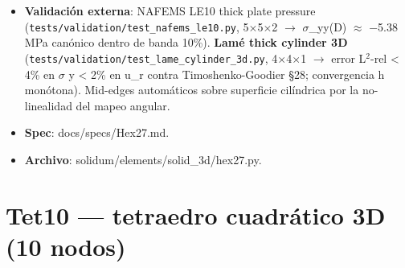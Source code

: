 \documentclass[11pt,letterpaper,oneside]{report}
\begin{document}
\begin{itemize}
  \item \textbf{Validación externa}: NAFEMS LE10 thick plate pressure (\texttt{tests/validation/test\_nafems\_le10.py}, 5\ensuremath{\times}5\ensuremath{\times}2 \ensuremath{\to} \ensuremath{\sigma}\_yy(D) \ensuremath{\approx} −5.38 MPa canónico dentro de banda 10\%). \textbf{Lamé thick cylinder 3D} (\texttt{tests/validation/test\_lame\_cylinder\_3d.py}, 4\ensuremath{\times}4\ensuremath{\times}1 \ensuremath{\to} error L\ensuremath{^{2}}-rel < 4\% en \ensuremath{\sigma} y < 2\% en u\_r contra Timoshenko-Goodier §28; convergencia h monótona). Mid-edges automáticos sobre superficie cilíndrica por la no-linealidad del mapeo angular.
  \item \textbf{Spec}: docs/specs/Hex27.md.
  \item \textbf{Archivo}: solidum/elements/solid\_3d/hex27.py.
\end{itemize}


\section{Tet10 --- tetraedro cuadrático 3D (10 nodos)}
\end{document}
